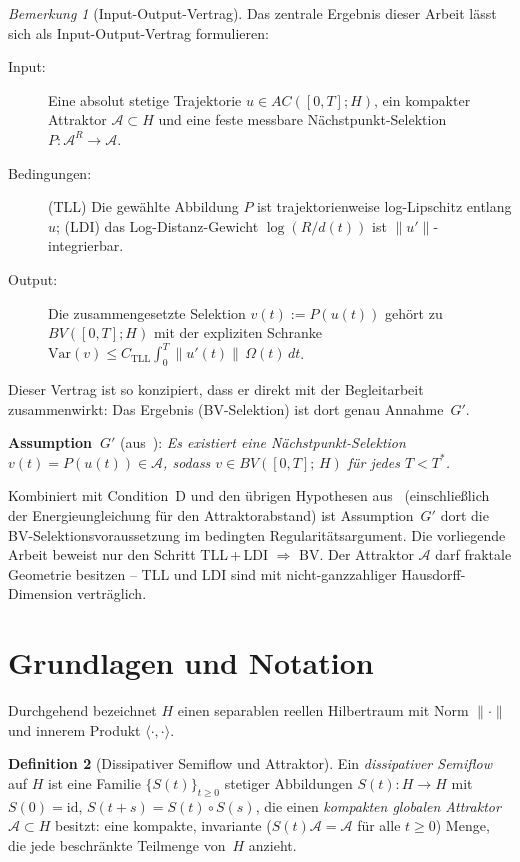 \documentclass[12pt,a4paper]{article}
\theoremstyle{definition}
\newtheorem{definition}{Definition}[section]
\theoremstyle{plain}
\theoremstyle{remark}
\newtheorem{remark}[definition]{Bemerkung}
\newcommand{\id}{\mathrm{id}}
\begin{document}
\begin{remark}[Input-Output-Vertrag]
\label{rem:api-contract}
Das zentrale Ergebnis dieser Arbeit lässt sich als Input-Output-Vertrag formulieren:
\begin{description}
\item[Input:] Eine absolut stetige Trajektorie $u \in AC([0,T]; H)$, ein kompakter Attraktor $\mathcal{A} \subset H$ und eine feste messbare Nächstpunkt-Selektion $P : \mathcal{A}^R \to \mathcal{A}$.
\item[Bedingungen:] (TLL) Die gewählte Abbildung $P$ ist trajektorienweise log-Lipschitz entlang $u$; (LDI) das Log-Distanz-Gewicht $\log(R/d(t))$ ist $\|u'\|$-integrierbar.
\item[Output:] Die zusammengesetzte Selektion $v(t) := P(u(t))$ gehört zu $BV([0,T]; H)$ mit der expliziten Schranke $\mathrm{Var}(v) \leq C_{\mathrm{TLL}} \int_0^T \|u'(t)\| \,\Omega(t)\,dt$.
\end{description}
Dieser Vertrag ist so konzipiert, dass er direkt mit der Begleitarbeit~\cite{FST-NS2026} zusammenwirkt: Das Ergebnis (BV-Selektion) ist dort genau Annahme~$G'$.

\smallskip\noindent
\textbf{Assumption~$G'$} (aus~\cite{FST-NS2026}):
\emph{Es existiert eine Nächstpunkt-Selektion
$v(t) = P(u(t)) \in \mathcal{A}$, sodass
$v \in BV([0,T];\,H)$ für jedes $T < T^*$.}

\smallskip\noindent
Kombiniert mit Condition~D und den übrigen Hypothesen aus~\cite{FST-NS2026} (einschließlich der Energieungleichung für den Attraktorabstand) ist Assumption~$G'$ dort die BV-Selektionsvoraussetzung im bedingten Regularitätsargument. Die vorliegende Arbeit beweist nur den Schritt TLL\,+\,LDI $\Rightarrow$ BV. Der Attraktor $\mathcal{A}$ darf fraktale Geometrie besitzen -- TLL und LDI sind mit nicht-ganzzahliger Hausdorff-Dimension verträglich.
\end{remark}


\section{Grundlagen und Notation}

Durchgehend bezeichnet $H$ einen separablen reellen Hilbertraum mit
Norm $\|\cdot\|$ und innerem Produkt $\langle\cdot,\cdot\rangle$.

\begin{definition}[Dissipativer Semiflow und Attraktor]
\label{def:semiflow}
Ein \emph{dissipativer Semiflow} auf $H$ ist eine Familie
$\{S(t)\}_{t \ge 0}$ stetiger Abbildungen $S(t): H \to H$ mit
$S(0) = \id$, $S(t+s) = S(t) \circ S(s)$, die einen
\emph{kompakten globalen Attraktor}
$\mathcal{A} \subset H$ besitzt: eine kompakte, invariante
($S(t)\mathcal{A} = \mathcal{A}$ für alle $t \ge 0$) Menge, die
jede beschränkte Teilmenge von~$H$ anzieht.
\end{definition}
\end{document}
